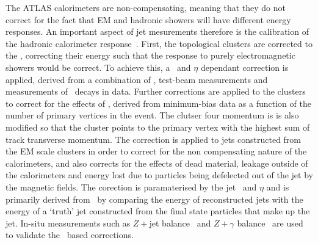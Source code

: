  The ATLAS calorimeters are non-compensating, meaning that
they do not
correct for the fact that EM and hadronic showers will have different energy
responses. An important aspect of jet mesurements therefore is the calibration of the hadronic
calorimeter response~\cite{cat_thesis}. First, the topological clusters are corrected to the , correcting their energy such that the response to purely electromagnetic
showers
would be correct. To achieve this, a \pt\ and $\eta$ dependant correction is
applied, derived from a combination of \mcsim, test-beam measurements and
measurements of \Zee\ decays in data. Further corrections are applied to the
clusters to correct for the effects of \pu, derived from minimum-bias
data as a function of the number of primary vertices in the event. 
The clutser four momentum is is also modified so that the
cluster points to the primary vertex with the highest sum of track
transverse momentum. The  correction is
applied to jets constructed from the EM scale clusters in order to correct for the non compensating nature of the calorimeters, and also
corrects for the effects of dead material, leakage outside of the
calorimeters and energy lost due to particles being defelected out of the jet by
the magnetic fields. The corection is paramaterised by
the jet \pt\ and $\eta$ and is primarily derived from \mcsim\ by comparing the
energy of reconstructed jets with the energy of a `truth' jet constructed from
the final state particles that make up the jet. In-situ measurements such as
$Z+$jet balance~\cite{ATLAS-CONF-2012-053} and $Z+\gamma$ balance~\cite{ATLAS-CONF-2012-063} are used to validate the \mc\ based corrections.



